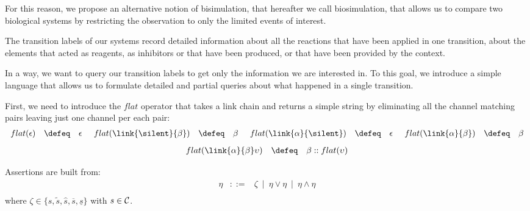 For this reason, we propose an alternative notion of bisimulation, that hereafter we call biosimulation,
that allows us  to compare two biological systems by restricting the observation to only the limited events of interest.

The transition labels of our systems record detailed information about all the reactions that have been applied in one transition, about the elements that acted as reagents, as inhibitors or that have been produced, or that have been provided by the context.

In a way, we want to query our transition labels to get only the information we are interested in.
To this goal, we introduce a simple language
that allows us to formulate detailed and partial queries about what happened in a single transition.

First, we need to introduce the $flat$ operator that takes a link chain and returns a simple string
by eliminating all the channel matching pairs leaving just one channel per each pair:\\
\[
\begin{array}{lcl@{\hspace{0.5cm}}lcl@{\hspace{0.5cm}}lcl@{\hspace{0.5cm}}lcl}
flat(\epsilon)&\defeq & \epsilon &
flat(\link{\silent}{\beta}) & \defeq & \beta &
flat(\link{\alpha}{\silent})& \defeq & \epsilon &
flat(\link{\alpha}{\beta}) & \defeq &\beta \\
\end{array}\]
\[
\begin{array}{lcl}
flat(\link{\alpha}{\beta}\upsilon)& \defeq & \beta :: flat(\upsilon)\\
\end{array}
\]

\begin{definition}
\label{def:assetionl}
Assertions are built from: 
$$
\begin{array}{lcl}
\eta &::=& \zeta ~\mid ~  \eta \vee \eta ~\mid ~  \eta \wedge \eta\\
\end{array}
$$
where $\zeta \in \{s, \tilde{s}, \hat{s}, \overline{s}, \underline{s} \}$ with  $s \in {\cal C}$.
\end{definition}


